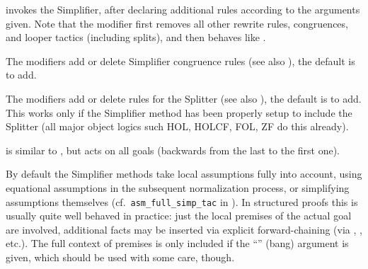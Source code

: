 \begin{isabellebody}
\begin{isamarkuptext}
  \begin{descr}

  \item [\hyperlink{method.simp}{\mbox{\isa{simp}}}] invokes the Simplifier, after declaring
  additional rules according to the arguments given.  Note that the
   modifier first removes all other rewrite rules,
  congruences, and looper tactics (including splits), and then behaves
  like .

  \medskip The  modifiers add or delete Simplifier
  congruence rules (see also \cite{isabelle-ref}), the default is to
  add.

  \medskip The  modifiers add or delete rules for the
  Splitter (see also \cite{isabelle-ref}), the default is to add.
  This works only if the Simplifier method has been properly setup to
  include the Splitter (all major object logics such HOL, HOLCF, FOL,
  ZF do this already).

  \item [\hyperlink{method.simp_all}{\mbox{\isa{simp{\isacharunderscore}all}}}] is similar to \hyperlink{method.simp}{\mbox{}}, but acts on
  all goals (backwards from the last to the first one).

  \end{descr}

  By default the Simplifier methods take local assumptions fully into
  account, using equational assumptions in the subsequent
  normalization process, or simplifying assumptions themselves (cf.\
  \verb|asm_full_simp_tac| in \cite[\S10]{isabelle-ref}).  In
  structured proofs this is usually quite well behaved in practice:
  just the local premises of the actual goal are involved, additional
  facts may be inserted via explicit forward-chaining (via \hyperlink{command.then}{\mbox{}}, \hyperlink{command.from}{\mbox{}}, \hyperlink{command.using}{\mbox{}} etc.).  The full
  context of premises is only included if the ``\isa{{\isachardoublequote}{\isacharbang}{\isachardoublequote}}'' (bang)
  argument is given, which should be used with some care, though.


\end{isamarkuptext}
\end{isabellebody}
